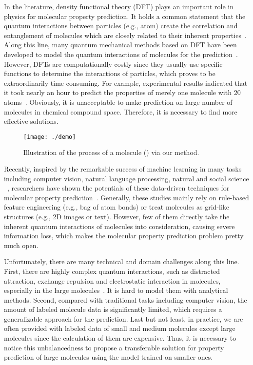 \documentclass[letterpaper]{article} \usepackage{bm}
\begin{document}
In the literature, density functional theory (DFT) plays an important role in physics for molecular property prediction. It holds a common statement that the quantum interactions between particles (e.g., atom) create the correlation and entanglement of molecules which are closely related to their inherent properties~\cite{thouless2014quantum}. Along this line, many quantum mechanical methods based on DFT have been developed to model the quantum interactions of molecules for the prediction~\cite{hohenberg1964inhomogeneous,kohn1965self}. However, DFTs are computationally costly since they usually use specific functions to determine the interactions of particles, which proves to be extraordinarily time consuming. For example, experimental results indicated that it took nearly an hour to predict the properties of merely one molecule with 20 atoms~\cite{Gilmer2017NeuralMP}. Obviously, it is unacceptable to make prediction on large number of molecules in chemical compound space. Therefore, it is necessary to find more effective solutions. 

\begin{figure}[tb]
	\centerline{\texttt{[image: ./demo]} }
	\caption{Illustration of the process of a molecule () via our method.}
	\label{demo}
\end{figure}


Recently, inspired by the remarkable success of machine learning in many tasks including computer vision, natural language processing, natural and social science ~\cite{Karpathy2014LargeScaleVC,He2016DeepRL,huang2017question,zhu2018xiaoice,liu2018finding}, researchers have shown the potentials of these data-driven techniques for molecular property prediction~\cite{faber2017prediction,schutt2017schnet}. Generally, these studies mainly rely on rule-based feature engineering (e.g., bag of atom bonds) or treat molecules as grid-like structures (e.g., 2D images or text). However, few of them directly take the inherent quantum interactions of molecules into consideration, causing severe information loss, which makes the molecular property prediction problem pretty much open.

Unfortunately, there are many technical and domain challenges along this line. First, there are highly complex quantum interactions, such as distracted attraction, exchange repulsion and electrostatic interaction in molecules, especially in the large molecules~\cite{kollman1985theory}. It is hard to model them with analytical methods. Second, compared with traditional tasks including computer vision, the amount of labeled molecule data is significantly limited, which requires a generalizable approach for the prediction. Last but not least, in practice, we are often provided with labeled data of small and medium molecules except large molecules since the calculation of them are expensive. Thus, it is necessary to notice this unbalancedness to propose a transferable solution for property prediction of large molecules using the model trained on smaller ones.
\end{document}
